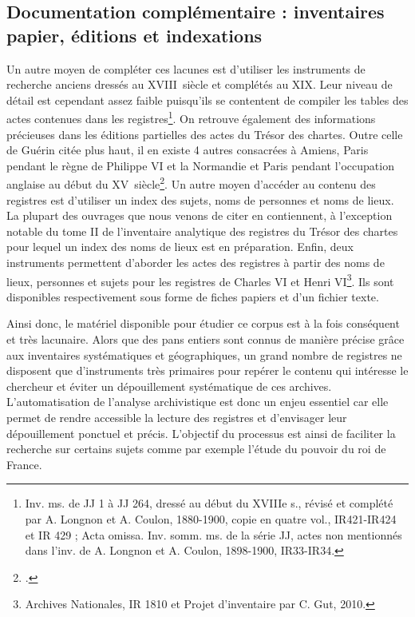 \documentclass[a4paper,12pt,twoside]{book}
\begin{document}
	\subsection{Documentation complémentaire : inventaires papier, éditions et indexations}
	
	Un autre moyen de compléter ces lacunes est d'utiliser les instruments de recherche anciens dressés au XVIII\ieme\ siècle et complétés au XIX\ieme. Leur niveau de détail est cependant assez faible puisqu'ils se contentent de compiler les tables des actes contenues dans les registres\footnote{Inv. ms. de JJ 1 à JJ 264, dressé au début du XVIIIe s., révisé et complété par A. Longnon et A. Coulon, 1880-1900, copie en quatre vol., IR421-IR424 et IR 429 ; Acta omissa. Inv. somm. ms. de la série JJ, actes non mentionnés dans	l’inv. de A. Longnon et A. Coulon, 1898-1900, IR33-IR34.}. On retrouve également des informations précieuses dans les éditions partielles des actes du Trésor des chartes. Outre celle de Guérin citée plus haut, il en existe 4 autres consacrées à Amiens, Paris pendant le règne de Philippe VI et la Normandie et Paris pendant l'occupation anglaise au début du XV\ieme\ siècle\footcite{guerin_actes_1881, viard_documents_1899, longnon_paris_1878, le_cacheux_actes_1907, maugis_documents_1908}. Un autre moyen d'accéder au contenu des registres est d'utiliser un index des sujets, noms de personnes et noms de lieux. La plupart des ouvrages que nous venons de citer en contiennent, à l'exception notable du tome II de l'inventaire analytique des registres du Trésor des chartes pour lequel un index des noms de lieux est en préparation. Enfin, deux instruments permettent d'aborder les actes des registres à partir des noms de lieux, personnes et sujets pour les registres de Charles VI et Henri VI\footnote{Archives Nationales, IR 1810 et Projet d'inventaire par C. Gut, 2010.}. Ils sont disponibles respectivement sous forme de fiches papiers et d'un fichier texte. 
	
	Ainsi donc, le matériel disponible pour étudier ce corpus est à la fois conséquent et très lacunaire. Alors que des pans entiers sont connus de manière précise grâce aux inventaires systématiques et géographiques, un grand nombre de registres ne disposent que d'instruments très primaires pour repérer le contenu qui intéresse le chercheur et éviter un dépouillement systématique de ces archives. L'automatisation de l'analyse archivistique est donc un enjeu essentiel car elle permet de rendre accessible la lecture des registres et d'envisager leur dépouillement ponctuel et précis. L'objectif du processus est ainsi de faciliter la recherche sur certains sujets comme par exemple l'étude du pouvoir du roi de France.  
\end{document}
